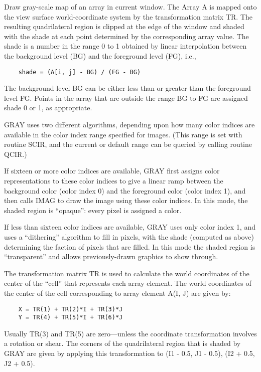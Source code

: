 Draw gray-scale map of an array in current window.  The Array A is
mapped onto the view surface world-coordinate system by the
transformation matrix TR.  The resulting quadrilateral region is
clipped at the edge of the window and shaded with the shade at each
point determined by the corresponding array value.  The shade is a
number in the range 0 to 1 obtained by linear interpolation between
the background level (BG) and the foreground level (FG), i.e.,

\begin{verbatim}
    shade = (A[i, j] - BG) / (FG - BG)
\end{verbatim}

The background level BG can be either less than or greater than the
foreground level FG.  Points in the array that are outside the range
BG to FG are assigned shade 0 or 1, as appropriate.

GRAY uses two different algorithms, depending upon how many color indices
are available in the color index range specified for images.  (This
range is set with routine SCIR, and the current or default range can
be queried by calling routine QCIR.)

If sixteen or more color indices are available, GRAY first assigns color
representations to these color indices to give a linear ramp between
the background color (color index 0) and the foreground color (color
index 1), and then calls IMAG to draw the image using these color
indices.  In this mode, the shaded region is ``opaque'': every pixel
is assigned a color.

If less than sixteen color indices are available, GRAY uses only color
index 1, and uses a ``dithering'' algorithm to fill in pixels, with
the shade (computed as above) determining the faction of pixels that
are filled.  In this mode the shaded region is ``transparent'' and
allows previously-drawn graphics to show through.

The transformation matrix TR is used to calculate the world
coordinates of the center of the ``cell'' that represents each array
element.  The world coordinates of the center of the cell
corresponding to array element A(I, J) are given by:

\begin{verbatim}
    X = TR(1) + TR(2)*I + TR(3)*J
    Y = TR(4) + TR(5)*I + TR(6)*J
\end{verbatim}

Usually TR(3) and TR(5) are zero---unless the coordinate
transformation involves a rotation or shear.  The corners of the
quadrilateral region that is shaded by GRAY are given by applying this
transformation to (I1 - 0.5, J1 - 0.5), (I2 + 0.5, J2 + 0.5).

